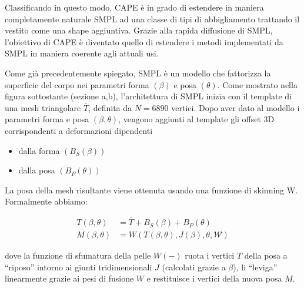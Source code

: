 \medskip

Classificando in questo modo, CAPE è in grado di estendere in maniera completamente naturale SMPL ad una classe di tipi di abbigliamento trattando il vestito come una shape aggiuntiva.
Grazie alla rapida diffusione di SMPL, l’obiettivo di CAPE è diventato quello di estendere i metodi implementati da SMPL in maniera coerente agli attuali usi.

\newpage

Come già precedentemente spiegato, SMPL è un modello che fattorizza la superficie del corpo nei parametri forma $(\beta)$ e posa $(\theta)$.
Come mostrato nella figura sottostante (sezione a,b), l'architettura di SMPL inizia con il template di una mesh triangolare $\bar{T}$, definita da $N=6890$ vertici. Dopo aver dato al modello i parametri forma e posa $(\beta, \theta)$, vengono aggiunti al template gli offset 3D corrispondenti a deformazioni dipendenti 

\medskip 

\begin{itemize}
\item dalla forma $\left(B_{S}(\beta)\right)$
\item dalla posa $\left(B_{P}(\theta)\right)$
\end{itemize}

La posa della mesh risultante viene ottenuta usando una funzione di skinning W. Formalmente abbiamo:

\medskip

\begin{equation}
\begin{aligned}
T(\beta, \theta) &=\bar{T}+B_{S}(\beta)+B_{P}(\theta) \\
M(\beta, \theta) &=W(T(\beta, \theta), J(\beta), \theta, \mathcal{W})
\end{aligned}
\end{equation}

\medskip

dove la funzione di sfumatura della pelle $W(-)$ ruota i vertici $T$ della posa a “riposo” intorno ai giunti tridimensionali $J$ (calcolati grazie a $\beta$), li “leviga” linearmente grazie ai pesi di fusione  $W$ e restituisce i vertici della nuova posa $M$. 

\medskip

